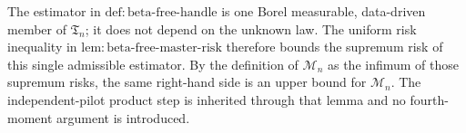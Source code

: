The estimator in \(\mathrm{def:beta\text{-}free\text{-}handle}\) is one Borel measurable, data-driven member of \(\mathfrak T_n\); it does not depend on the unknown law. The uniform risk inequality in \(\mathrm{lem:beta\text{-}free\text{-}master\text{-}risk}\) therefore bounds the supremum risk of this single admissible estimator. By the definition of \(\mathcal M_n\) as the infimum of those supremum risks, the same right-hand side is an upper bound for \(\mathcal M_n\). The independent-pilot product step is inherited through that lemma and no fourth-moment argument is introduced.